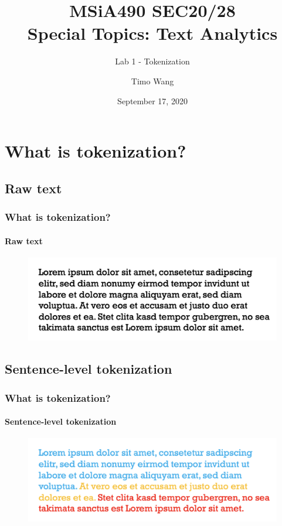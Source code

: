 \documentclass{beamer}
\begin{document}
\title{MSiA490 SEC20/28\\ Special Topics: Text Analytics}
\subtitle{Lab 1 - Tokenization}
\author{Timo Wang}
\date{September 17, 2020}

\titlepage

\section{What is tokenization?}
\subsection{Raw text}
\begin{frame}
    \frametitle{What is tokenization?}
    \framesubtitle{Raw text}
    \begin{figure}
        \includegraphics[scale=0.3]{raw-text}    
    \end{figure}
\end{frame}

\subsection{Sentence-level tokenization}
\begin{frame}
    \frametitle{What is tokenization?}
    \framesubtitle{Sentence-level tokenization}
    \begin{figure}
        \includegraphics[scale=0.3]{sent}  
    \end{figure}
\end{frame}
\end{document}
